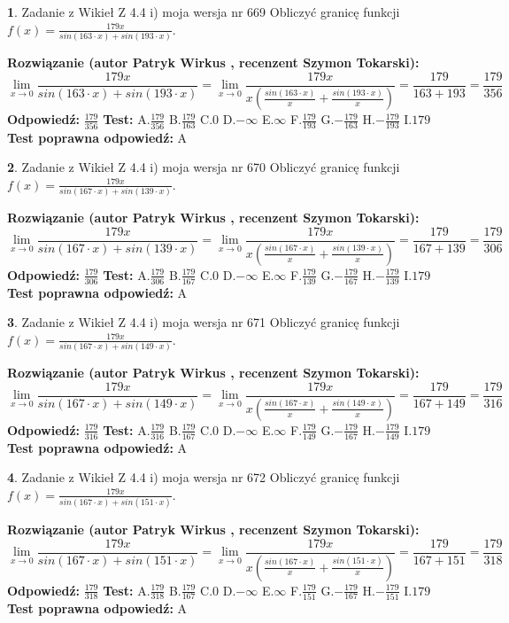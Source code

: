 \documentclass[12pt, a4paper]{article}
\theoremstyle{definition} %
\newtheorem{zad}{}
\newcommand{\zadStart}[1]{\begin{zad}#1\newline}
\newcommand{\zadStop}{\end{zad}}
\newcommand{\rozwStart}[2]{\noindent \textbf{Rozwiązanie (autor #1 , recenzent #2): }\newline}
\newcommand{\rozwStop}{\newline}
\newcommand{\odpStart}{\noindent \textbf{Odpowiedź:}\newline}
\newcommand{\odpStop}{\newline}
\newcommand{\testStart}{\noindent \textbf{Test:}\newline}
\newcommand{\testStop}{\newline}
\newcommand{\kluczStart}{\noindent \textbf{Test poprawna odpowiedź:}\newline}
\newcommand{\kluczStop}{\newline}
\begin{document}
\zadStart{Zadanie z Wikieł Z 4.4 i) moja wersja nr 669}
Obliczyć granicę funkcji $f(x)=\frac{179x}{sin(163\cdot x) +sin(193\cdot x)}$.
\zadStop
\rozwStart{Patryk Wirkus}{Szymon Tokarski}
$$\lim\limits_{x\to 0}\frac{179x}{sin(163\cdot x) +sin(193\cdot x)}=\lim\limits_{x\to 0}\frac{179x}{x(\frac{sin(163\cdot x)}{x}+\frac{sin(193\cdot x)}{x})}=\frac{179}{163+193} = \frac{179}{356}$$
\rozwStop
\odpStart
$\frac{179}{356}$
\odpStop
\testStart
A.$\frac{179}{356}$
B.$\frac{179}{163}$
C.$0$
D.$-\infty$
E.$\infty$
F.$\frac{179}{193}$
G.$-\frac{179}{163}$
H.$-\frac{179}{193}$
I.$179$
\testStop
\kluczStart
A
\kluczStop



\zadStart{Zadanie z Wikieł Z 4.4 i) moja wersja nr 670}
Obliczyć granicę funkcji $f(x)=\frac{179x}{sin(167\cdot x) +sin(139\cdot x)}$.
\zadStop
\rozwStart{Patryk Wirkus}{Szymon Tokarski}
$$\lim\limits_{x\to 0}\frac{179x}{sin(167\cdot x) +sin(139\cdot x)}=\lim\limits_{x\to 0}\frac{179x}{x(\frac{sin(167\cdot x)}{x}+\frac{sin(139\cdot x)}{x})}=\frac{179}{167+139} = \frac{179}{306}$$
\rozwStop
\odpStart
$\frac{179}{306}$
\odpStop
\testStart
A.$\frac{179}{306}$
B.$\frac{179}{167}$
C.$0$
D.$-\infty$
E.$\infty$
F.$\frac{179}{139}$
G.$-\frac{179}{167}$
H.$-\frac{179}{139}$
I.$179$
\testStop
\kluczStart
A
\kluczStop



\zadStart{Zadanie z Wikieł Z 4.4 i) moja wersja nr 671}
Obliczyć granicę funkcji $f(x)=\frac{179x}{sin(167\cdot x) +sin(149\cdot x)}$.
\zadStop
\rozwStart{Patryk Wirkus}{Szymon Tokarski}
$$\lim\limits_{x\to 0}\frac{179x}{sin(167\cdot x) +sin(149\cdot x)}=\lim\limits_{x\to 0}\frac{179x}{x(\frac{sin(167\cdot x)}{x}+\frac{sin(149\cdot x)}{x})}=\frac{179}{167+149} = \frac{179}{316}$$
\rozwStop
\odpStart
$\frac{179}{316}$
\odpStop
\testStart
A.$\frac{179}{316}$
B.$\frac{179}{167}$
C.$0$
D.$-\infty$
E.$\infty$
F.$\frac{179}{149}$
G.$-\frac{179}{167}$
H.$-\frac{179}{149}$
I.$179$
\testStop
\kluczStart
A
\kluczStop



\zadStart{Zadanie z Wikieł Z 4.4 i) moja wersja nr 672}
Obliczyć granicę funkcji $f(x)=\frac{179x}{sin(167\cdot x) +sin(151\cdot x)}$.
\zadStop
\rozwStart{Patryk Wirkus}{Szymon Tokarski}
$$\lim\limits_{x\to 0}\frac{179x}{sin(167\cdot x) +sin(151\cdot x)}=\lim\limits_{x\to 0}\frac{179x}{x(\frac{sin(167\cdot x)}{x}+\frac{sin(151\cdot x)}{x})}=\frac{179}{167+151} = \frac{179}{318}$$
\rozwStop
\odpStart
$\frac{179}{318}$
\odpStop
\testStart
A.$\frac{179}{318}$
B.$\frac{179}{167}$
C.$0$
D.$-\infty$
E.$\infty$
F.$\frac{179}{151}$
G.$-\frac{179}{167}$
H.$-\frac{179}{151}$
I.$179$
\testStop
\kluczStart
A
\kluczStop
\end{document}
